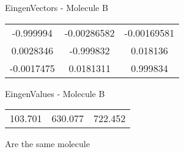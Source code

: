\begin{multicols}{2}
\begin{center}
\vtab
 EingenVectors - Molecule B     \\
\vtab
\begin{tabular}{|c c c|}
-0.999994	 & 	-0.00286582	 & 	-0.00169581	 \\
0.0028346	 & 	-0.999832	 & 	0.018136	 \\
-0.0017475	 & 	0.0181311	 & 	0.999834
\end{tabular}

\vtab
 EingenValues - Molecule B     \\
\vtab
\begin{tabular}{|c c c|}
103.701	 & 	630.077	 & 	722.452
\end{tabular}

\end{center}
\end{multicols}
\begin{center}
\vtab
\vtab
\textcolor{NavyBlue}{\Large Are the same molecule}
\end{center}
\newpage

